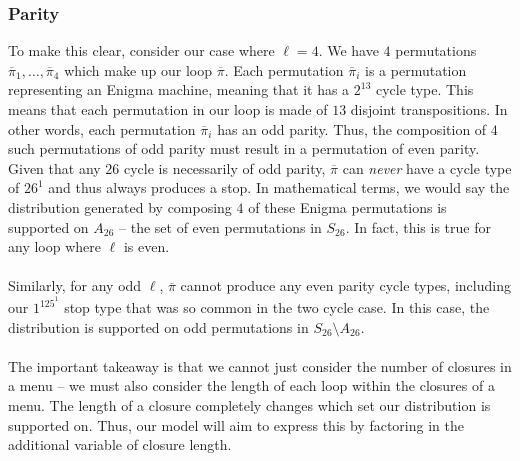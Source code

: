 \subsubsection{Parity}
To make this clear, consider our case where $\ell=4$. We have $4$
permutations $\overline\pi_1,\dots, \overline\pi_4$ which make up our
loop $\overline\pi$. Each permutation $\overline\pi_i$ is a
permutation representing an Enigma machine, meaning that it has a
$2^{13}$ cycle type. This means that each permutation in our loop is made
of $13$ disjoint transpositions. In other words, each permutation
$\overline\pi_i$ has an odd parity. Thus, the composition of $4$ such
permutations of odd parity must result in a permutation of even
parity. Given that any $26$ cycle is necessarily of odd parity,
$\overline\pi$ can \emph{never} have a cycle type of $26^1$ and thus
always produces a stop. In mathematical terms, we would say the
distribution generated by composing $4$ of these Enigma permutations
is supported on $A_{26}$ -- the set of even permutations in $S_{26}$.
In fact, this is true for any loop where $\ell$ is even.
\\\\Similarly, for any odd $\ell$, $\overline\pi$ cannot produce any
even parity cycle types, including our $1^125^1$ stop type that was
so common in the two cycle case. In this case, the distribution is
supported on odd permutations in $S_{26}\setminus A_{26}$.
\\\\The important takeaway is that we cannot just consider the number
of closures in a menu -- we must also consider the length of each
loop within the closures of a menu. The length of a closure
completely changes which set our distribution is supported on. Thus,
our model will aim to express this by factoring in the additional
variable of closure length.

